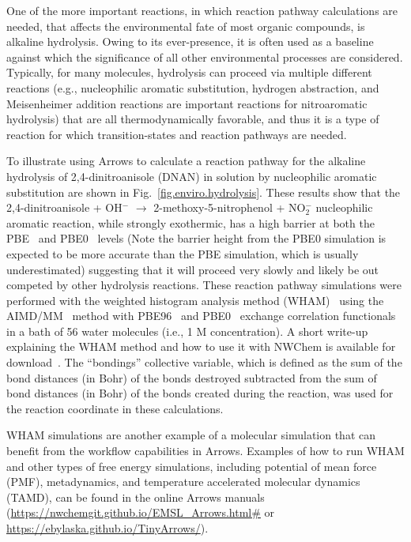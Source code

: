 \documentclass[runningheads,a4paper]{llncs}
\begin{document}
One of the more important reactions, in which reaction pathway calculations are needed, that affects the environmental fate of most organic compounds, is alkaline hydrolysis.  Owing to its ever-presence, it is often used as a baseline against which the significance of all other environmental processes are considered. Typically, for many molecules, hydrolysis can proceed via multiple different reactions (e.g., nucleophilic aromatic substitution, hydrogen abstraction, and Meisenheimer addition reactions are important reactions for nitroaromatic hydrolysis)  that are all thermodynamically favorable, and thus it is a type of reaction for which transition-states and reaction pathways are needed.  

To illustrate using Arrows to calculate a reaction pathway for the alkaline hydrolysis of 2,4-dinitroanisole (DNAN) in solution by nucleophilic aromatic substitution are shown in Fig.~\ref{fig.enviro.hydrolysis}.
These results show that the 2,4-dinitroanisole + OH$^-$ $\rightarrow$ 2-methoxy-5-nitrophenol + NO$_2^-$ nucleophilic aromatic reaction, while strongly exothermic, has a high barrier at both the PBE~\cite{perdew1996generalized} and PBE0~\cite{adamo1999toward} levels (Note the barrier height from the PBE0 simulation is expected to be more accurate than the PBE simulation, which is usually underestimated) suggesting that it will proceed very slowly and likely be out competed by other hydrolysis reactions.  These reaction pathway simulations were performed with the weighted histogram analysis method (WHAM)~\cite{SOUAILLE200140} using the AIMD/MM~\cite{laio2002hamiltonian,cauet2010structure} method with PBE96~\cite{perdew1996generalized} and PBE0~\cite{adamo1999toward} exchange correlation functionals in a bath of 56 water molecules (i.e., 1 M concentration).  
A short write-up explaining the WHAM method and how to use it with NWChem is available for download~\cite{attafinite}.  The “bondings” collective variable, which is defined as the sum of the bond distances (in Bohr) of the bonds destroyed subtracted from the sum of bond distances (in Bohr) of the bonds created during the reaction, was used for the reaction coordinate in these calculations.

WHAM simulations are another example of a  molecular simulation that can benefit from the workflow capabilities in Arrows.  Examples of how to run WHAM and other types of free energy simulations, including potential of mean force (PMF), metadynamics, and temperature accelerated molecular dynamics (TAMD),  can be found in the online Arrows manuals (\url{https://nwchemgit.github.io/EMSL_Arrows.html#} or 
 \url{https://ebylaska.github.io/TinyArrows/}).
\end{document}
